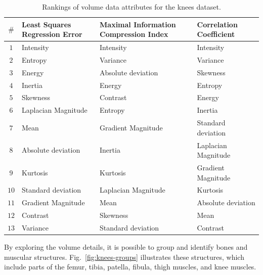 \begin{table}[htb!]
    \caption{Rankings of volume data attributes for the knees dataset.}
    \label{tab:feature-ranking-for-knees}
    \centering
    \begin{tabular}{@{}c>{\centering\arraybackslash}m{}>{\centering\arraybackslash}m{}>{\centering\arraybackslash}m{}@{}}
        \toprule
         \textbf{$\#$} & \textbf{Least Squares Regression Error} & \textbf{Maximal Information Compression Index} & \textbf{Correlation Coefficient}\\
        \midrule
        $1$ & Intensity &  Intensity &  Intensity \\
        \hline
        $2$ & Entropy &  Variance &  Variance \\
        \hline
        $3$ & Energy &  Absolute deviation &  Skewness \\
        \hline
        $4$ & Inertia &  Energy &  Entropy \\
        \hline
        $5$ & Skewness &  Contrast &  Energy \\
        \hline
        $6$ & Laplacian Magnitude &  Entropy &  Inertia \\
        \hline
        $7$ & Mean &  Gradient Magnitude &  Standard deviation \\
        \hline
        $8$ & Absolute deviation &  Inertia &  Laplacian Magnitude \\
        \hline
        $9$ & Kurtosis &  Kurtosis &  Gradient Magnitude \\
        \hline
        $10$ & Standard deviation &  Laplacian Magnitude &  Kurtosis \\
        \hline
        $11$ & Gradient Magnitude &  Mean &  Absolute deviation \\
        \hline
        $12$ & Contrast &  Skewness &  Mean \\
        \hline
        $13$ & Variance &  Standard deviation &  Contrast \\
        \bottomrule
    \end{tabular}
\end{table}

By exploring the volume details, it is possible to group and identify bones and muscular structures. Fig.~\ref{fig:knees-groups} illustrates these structures, which include parts of the femur, tibia, patella, fibula, thigh muscles, and knee muscles.

